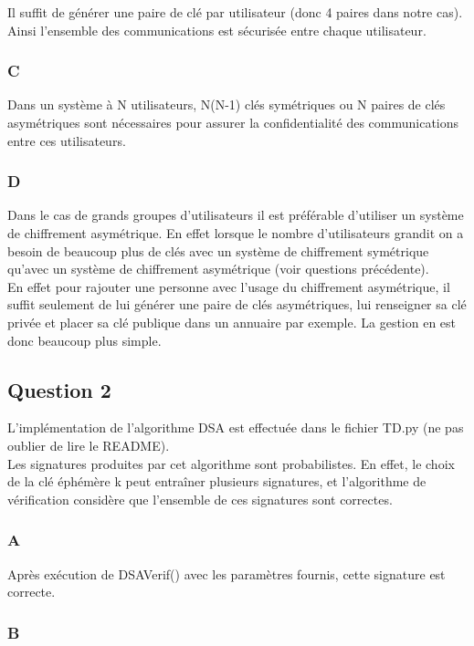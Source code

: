 \documentclass[a4paper, 11pt, oneside]{article}
\begin{document}
Il suffit de générer une paire de clé par utilisateur (donc 4 paires dans notre cas). Ainsi l'ensemble des communications est sécurisée entre chaque utilisateur.

\subsubsection{C}

Dans un système à N utilisateurs, N(N-1) clés symétriques ou N paires de clés asymétriques sont nécessaires pour assurer la confidentialité des communications entre ces utilisateurs.

\subsubsection{D}

Dans le cas de grands groupes d'utilisateurs il est préférable d'utiliser un système de chiffrement asymétrique. En effet lorsque le nombre d'utilisateurs grandit on a besoin de beaucoup plus de clés avec un système de chiffrement symétrique qu'avec un système de chiffrement asymétrique (voir questions précédente).\\
En effet pour rajouter une personne avec l'usage du chiffrement asymétrique,  il suffit seulement de lui générer une paire de clés asymétriques, lui renseigner sa clé privée et placer sa clé publique dans un annuaire par exemple. La gestion en est donc beaucoup plus simple.

\subsection{Question 2}

L'implémentation de l'algorithme DSA est effectuée dans le fichier TD.py (ne pas oublier de lire le README).\\
Les signatures produites par cet algorithme sont probabilistes. En effet, le choix de la clé éphémère k peut entraîner plusieurs signatures, et l'algorithme de vérification considère que l'ensemble de ces signatures sont correctes.

\subsubsection{A}

Après exécution de DSAVerif() avec les paramètres fournis, cette signature est correcte.

\subsubsection{B}
\end{document}

